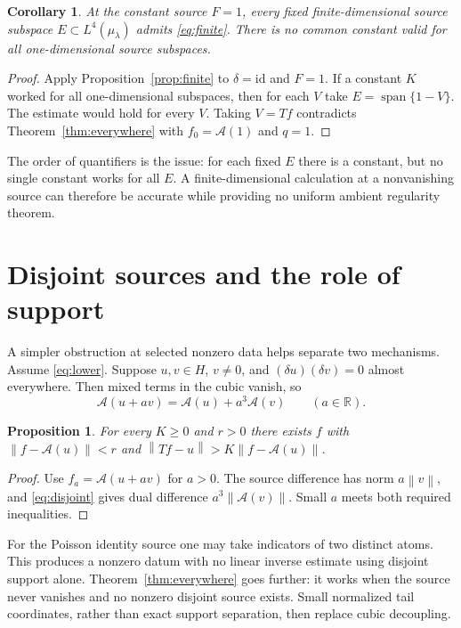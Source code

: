 \documentclass[11pt]{article}
\newtheorem{proposition}[theorem]{Proposition}
\newtheorem{corollary}[theorem]{Corollary}
\theoremstyle{remark}\newtheorem{remark}[theorem]{Remark}
\newcommand{\R}{\mathbb R}
\newcommand{\norm}[1]{\left\lVert#1\right\rVert}
\newcommand{\A}{\mathcal A}
\begin{document}
\begin{corollary}\label{cor:directions}
At the constant source $F=1$, every fixed finite-dimensional source
subspace $E\subset L^4(\mu_\lambda)$ admits \eqref{eq:finite}. There
is no common constant valid for all one-dimensional source subspaces.
\end{corollary}
\begin{proof}
Apply Proposition~\ref{prop:finite} to $\delta=\mathrm{id}$ and $F=1$.
If a constant $K$ worked for all one-dimensional subspaces, then for
each $V$ take $E=\operatorname{span}\{1-V\}$. The estimate would hold
for every $V$. Taking $V=Tf$ contradicts Theorem~\ref{thm:everywhere}
with $f_0=\A(1)$ and $q=1$.
\end{proof}

The order of quantifiers is the issue: for each fixed $E$ there is a
constant, but no single constant works for all $E$. A finite-dimensional
calculation at a nonvanishing source can therefore be accurate while
providing no uniform ambient regularity theorem.

\section{Disjoint sources and the role of support}
A simpler obstruction at selected nonzero data helps separate two
mechanisms. Assume \eqref{eq:lower}. Suppose $u,v\in H$, $v\neq0$,
and $(\delta u)(\delta v)=0$ almost everywhere. Then mixed terms in
the cubic vanish, so
\begin{equation}\label{eq:disjoint}
 \A(u+av)=\A(u)+a^3\A(v)\qquad(a\in\R).
\end{equation}
\begin{proposition}\label{prop:disjoint}
For every $K\geq0$ and $r>0$ there exists $f$ with
$\norm{f-\A(u)}<r$ and
$\norm{Tf-u}>K\norm{f-\A(u)}$.
\end{proposition}
\begin{proof}
Use $f_a=\A(u+av)$ for $a>0$. The source difference has norm
$a\norm v$, and \eqref{eq:disjoint} gives dual difference
$a^3\norm{\A(v)}$. Small $a$ meets both required inequalities.
\end{proof}

For the Poisson identity source one may take indicators of two
distinct atoms. This produces a nonzero datum with no linear inverse
estimate using disjoint support alone. Theorem~\ref{thm:everywhere}
goes further: it works when the source never vanishes and no nonzero
disjoint source exists. Small normalized tail coordinates, rather
than exact support separation, then replace cubic decoupling.
\end{document}
